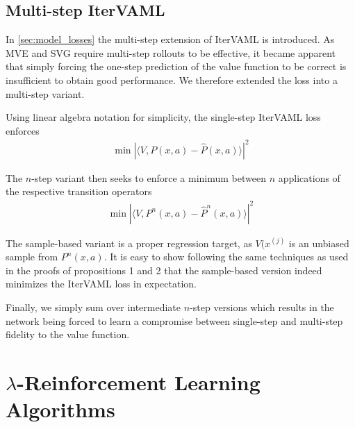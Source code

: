 \subsection{Multi-step IterVAML}
\label{app:multi-step-itervaml}

In \autoref{sec:model_losses} the multi-step extension of IterVAML is introduced.
As MVE and SVG require multi-step rollouts to be effective, it became apparent that simply forcing the one-step prediction of the value function to be correct is insufficient to obtain good performance.
We therefore extended the loss into a multi-step variant.

Using linear algebra notation for simplicity, the single-step IterVAML loss enforces
\begin{align*}
    \min \left| \langle V, P(x,a)-\hat{P}(x,a)\rangle\right|^2
\end{align*}

The $n$-step variant then seeks to enforce a minimum between $n$ applications of the respective transition operators 
\begin{align*}
    \min \left| \langle V, P^n(x,a)-\hat{P}^n(x,a)\rangle\right|^2
\end{align*}

The sample-based variant is a proper regression target, as $V(x^{(j)}$ is an unbiased sample from $P^n(x,a)$.
It is easy to show following the same techniques as used in the proofs of propositions 1 and 2 that the sample-based version indeed minimizes the IterVAML loss in expectation.

Finally, we simply sum over intermediate $n$-step versions which results in the network being forced to learn a compromise between single-step and multi-step fidelity to the value function.

\section{$\lambda$-Reinforcement Learning Algorithms}
\label{app:lambda-table}

